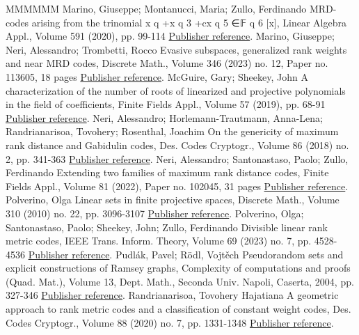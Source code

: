 \begin{thebibliography}{MMMMMM}
 Marino, Giuseppe; Montanucci, Maria; Zullo, Ferdinando MRD-codes arising from the trinomial x q +x q 3  +cx q 5  ∈𝔽 q 6  [x], Linear Algebra Appl., Volume 591 (2020), pp. 99-114 \href{https://alco.centre-mersenne.org/articles/10.5802/alco.377/#marino2020mrd}{Publisher reference}.
 Marino, Giuseppe; Neri, Alessandro; Trombetti, Rocco Evasive subspaces, generalized rank weights and near MRD codes, Discrete Math., Volume 346 (2023) no. 12, Paper no. 113605, 18 pages \href{https://alco.centre-mersenne.org/articles/10.5802/alco.377/#marino2022evasive}{Publisher reference}.
 McGuire, Gary; Sheekey, John A characterization of the number of roots of linearized and projective polynomials in the field of coefficients, Finite Fields Appl., Volume 57 (2019), pp. 68-91 \href{https://alco.centre-mersenne.org/articles/10.5802/alco.377/#mcguire2019characterization}{Publisher reference}.
 Neri, Alessandro; Horlemann-Trautmann, Anna-Lena; Randrianarisoa, Tovohery; Rosenthal, Joachim On the genericity of maximum rank distance and Gabidulin codes, Des. Codes Cryptogr., Volume 86 (2018) no. 2, pp. 341-363 \href{https://alco.centre-mersenne.org/articles/10.5802/alco.377/#neri2018genericity}{Publisher reference}.
 Neri, Alessandro; Santonastaso, Paolo; Zullo, Ferdinando Extending two families of maximum rank distance codes, Finite Fields Appl., Volume 81 (2022), Paper no. 102045, 31 pages \href{https://alco.centre-mersenne.org/articles/10.5802/alco.377/#NPZ}{Publisher reference}.
 Polverino, Olga Linear sets in finite projective spaces, Discrete Math., Volume 310 (2010) no. 22, pp. 3096-3107 \href{https://alco.centre-mersenne.org/articles/10.5802/alco.377/#polverino2010linear}{Publisher reference}.
 Polverino, Olga; Santonastaso, Paolo; Sheekey, John; Zullo, Ferdinando Divisible linear rank metric codes, IEEE Trans. Inform. Theory, Volume 69 (2023) no. 7, pp. 4528-4536 \href{https://alco.centre-mersenne.org/articles/10.5802/alco.377/#polverino2023divisible}{Publisher reference}.
 Pudlák, Pavel; Rödl, Vojtěch Pseudorandom sets and explicit constructions of Ramsey graphs, Complexity of computations and proofs (Quad. Mat.), Volume 13, Dept. Math., Seconda Univ. Napoli, Caserta, 2004, pp. 327-346 \href{https://alco.centre-mersenne.org/articles/10.5802/alco.377/#pudlak2004pseudorandom}{Publisher reference}.
 Randrianarisoa, Tovohery Hajatiana A geometric approach to rank metric codes and a classification of constant weight codes, Des. Codes Cryptogr., Volume 88 (2020) no. 7, pp. 1331-1348 \href{https://alco.centre-mersenne.org/articles/10.5802/alco.377/#randrianarisoa2020geometric}{Publisher reference}.

\end{thebibliography}
